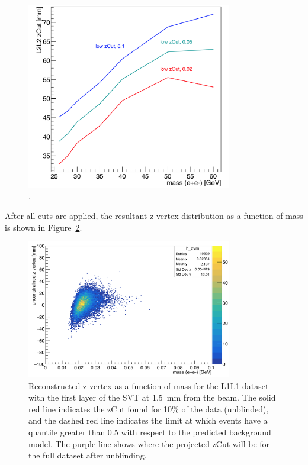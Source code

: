 \begin{figure}[H]
  \centering
     \includegraphics[width=0.8\textwidth]{plots/L2L2_proposedZcut_1p5.png}
  \caption{.}
  \label{fig:L2L2_zCut_1p5}
\end{figure} 

After all cuts are applied, the resultant z vertex distribution as a function of mass is shown in Figure~\ref{fig:zVm_L2L2_1p5}.

\begin{figure}[H]
  \centering
     \includegraphics[width=0.8\textwidth]{plots/zVm_L2L2_1p5.png}
  \caption{Reconstructed z vertex as a function of mass for the L1L1 dataset with the first layer of the SVT at 1.5~mm from the beam. The solid red line indicates the zCut found for 10$\%$ of the data (unblinded), and the dashed red line indicates the limit at which events have a quantile greater than 0.5 with respect to the predicted background model. The purple line shows where the projected zCut will be for the full dataset after unblinding.}
  \label{fig:zVm_L2L2_1p5}
\end{figure} 

